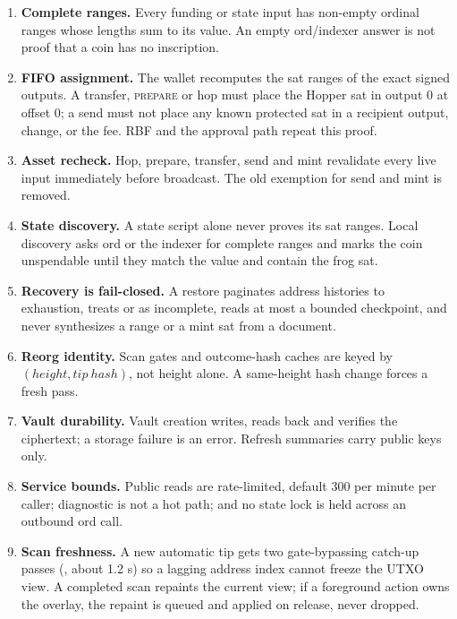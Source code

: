 \begin{enumerate}[leftmargin=1.7em,itemsep=0.25em]
  \item \textbf{Complete ranges.} Every funding or state input has non-empty
        ordinal ranges whose lengths sum to its value. An empty
        ord/indexer answer is not proof that a coin has no inscription.
  \item \textbf{FIFO assignment.} The wallet recomputes the sat ranges of
        the exact signed outputs. A transfer, \textsc{prepare} or hop must
        place the Hopper sat in output 0 at offset 0; a send must not place
        any known protected sat in a recipient output, change, or the fee.
        RBF and the approval path repeat this proof.
  \item \textbf{Asset recheck.} Hop, prepare, transfer, send and mint
        revalidate every live input immediately before broadcast. The old
        exemption for send and mint is removed.
  \item \textbf{State discovery.} A state script alone never proves its sat
        ranges. Local discovery asks ord or the indexer for complete ranges
        and marks the coin unspendable until they match the value and
        contain the frog sat.
  \item \textbf{Recovery is fail-closed.} A restore paginates address
        histories to exhaustion, treats  or  as
        incomplete, reads at most a bounded checkpoint, and never
        synthesizes a range or a mint sat from a document.
  \item \textbf{Reorg identity.} Scan gates and outcome-hash caches are
        keyed by $(\mathit{height},\mathit{tip\ hash})$, not height alone.
        A same-height hash change forces a fresh pass.
  \item \textbf{Vault durability.} Vault creation writes, reads back and
        verifies the ciphertext; a storage failure is an error. Refresh
        summaries carry public keys only.
  \item \textbf{Service bounds.} Public reads are rate-limited, default
        300 per minute per caller; diagnostic  is not a
        hot path; and no state lock is held across an outbound ord call.
  \item \textbf{Scan freshness.} A new automatic tip gets two
        gate-bypassing catch-up passes (, about 1.2 s)
        so a lagging address index cannot freeze the UTXO view. A completed
        scan repaints the current view; if a foreground action owns the
        overlay, the repaint is queued and applied on release, never dropped.
\end{enumerate}

